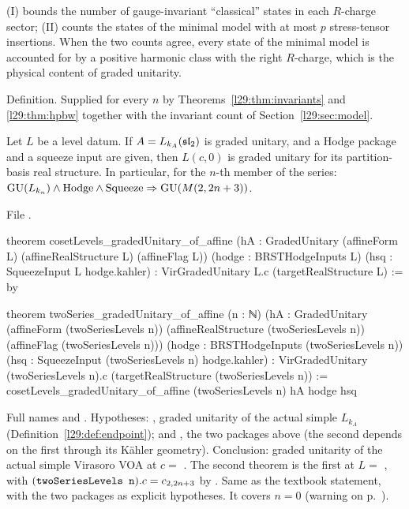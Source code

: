 \begin{physics}
(I) bounds the number of gauge-invariant ``classical'' states in each $R$-charge sector; (II) counts the states of the
minimal model with at most $p$ stress-tensor insertions. When the two counts agree, every state of the minimal model
is accounted for by a positive harmonic class with the right $R$-charge, which is the physical content of graded
unitarity.
\end{physics}

\begin{status}
Definition. Supplied for every $n$ by Theorems~\ref{l29:thm:invariants} and \ref{l29:thm:hpbw} together with the
invariant count of Section~\ref{l29:sec:model}.
\end{status}

\begin{theorem}\label{l29:thm:transfer}
Let $L$ be a level datum. If $A=L_{k_A}(\mathfrak{sl}_2)$ is graded unitary, and a Hodge package and a squeeze input
are given, then $L(c,0)$ is graded unitary for its partition-basis real structure. In particular, for the $n$-th
member of the series: $\mathrm{GU}(L_{k_n})\wedge\mathrm{Hodge}\wedge\mathrm{Squeeze}\Rightarrow
\mathrm{GU}(M(2,2n+3))$.
\end{theorem}

\noindent File .
\begin{leancode}
theorem cosetLevels_gradedUnitary_of_affine
    (hA : GradedUnitary (affineForm L) (affineRealStructure L) (affineFlag L))
    (hodge : BRSTHodgeInputs L) (hsq : SqueezeInput L hodge.kahler) :
    VirGradedUnitary L.c (targetRealStructure L) := by

theorem twoSeries_gradedUnitary_of_affine (n : ℕ)
    (hA : GradedUnitary (affineForm (twoSeriesLevels n)) (affineRealStructure (twoSeriesLevels n))
      (affineFlag (twoSeriesLevels n)))
    (hodge : BRSTHodgeInputs (twoSeriesLevels n))
    (hsq : SqueezeInput (twoSeriesLevels n) hodge.kahler) :
    VirGradedUnitary (twoSeriesLevels n).c (targetRealStructure (twoSeriesLevels n)) :=
  cosetLevels_gradedUnitary_of_affine (twoSeriesLevels n) hA hodge hsq
\end{leancode}

\begin{dictionary}
Full names  and .
Hypotheses: , graded unitarity of the actual simple $L_{k_A}$ (Definition~\ref{l29:def:endpoint}); 
and , the two packages above (the second depends on the first through its Kähler geometry). Conclusion:
graded unitarity of the actual simple Virasoro VOA at $c=$ . The second theorem is the first at
$L=$ , with $(\lean{twoSeriesLevels n}).c=c_{2,2n+3}$ by . Same as the
textbook statement, with the two packages as explicit hypotheses. It covers $n=0$ (warning on p.~\pageref{l29:warn:index}).
\end{dictionary}

